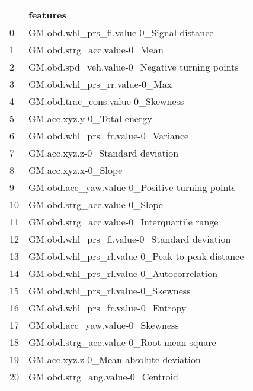 \begin{tabular}{ll}
\toprule
{} &                                         features \\
\midrule
0  &        GM.obd.whl\_prs\_fl.value-0\_Signal distance \\
1  &                     GM.obd.strg\_acc.value-0\_Mean \\
2  &   GM.obd.spd\_veh.value-0\_Negative turning points \\
3  &                    GM.obd.whl\_prs\_rr.value-0\_Max \\
4  &                GM.obd.trac\_cons.value-0\_Skewness \\
5  &                      GM.acc.xyz.y-0\_Total energy \\
6  &               GM.obd.whl\_prs\_fr.value-0\_Variance \\
7  &                GM.acc.xyz.z-0\_Standard deviation \\
8  &                             GM.acc.xyz.x-0\_Slope \\
9  &   GM.obd.acc\_yaw.value-0\_Positive turning points \\
10 &                    GM.obd.strg\_acc.value-0\_Slope \\
11 &      GM.obd.strg\_acc.value-0\_Interquartile range \\
12 &     GM.obd.whl\_prs\_fl.value-0\_Standard deviation \\
13 &  GM.obd.whl\_prs\_rl.value-0\_Peak to peak distance \\
14 &        GM.obd.whl\_prs\_rl.value-0\_Autocorrelation \\
15 &               GM.obd.whl\_prs\_rl.value-0\_Skewness \\
16 &                GM.obd.whl\_prs\_fr.value-0\_Entropy \\
17 &                  GM.obd.acc\_yaw.value-0\_Skewness \\
18 &         GM.obd.strg\_acc.value-0\_Root mean square \\
19 &           GM.acc.xyz.z-0\_Mean absolute deviation \\
20 &                 GM.obd.strg\_ang.value-0\_Centroid \\
\bottomrule
\end{tabular}
